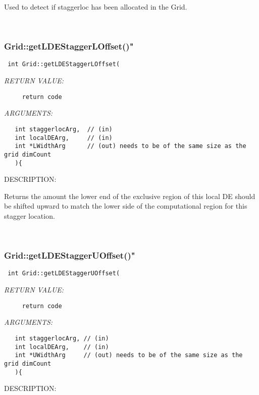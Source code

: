     Used to detect if staggerloc has been allocated in the Grid.
  
   
 
\mbox{}\hrulefill\
 
\subsubsection [Grid::getLDEStaggerLOffset()"] {Grid::getLDEStaggerLOffset()"}


  
\begin{verbatim} int Grid::getLDEStaggerLOffset(\end{verbatim}{\em RETURN VALUE:}
\begin{verbatim}     return code\end{verbatim}{\em ARGUMENTS:}
\begin{verbatim}   int staggerlocArg,  // (in)
   int localDEArg,     // (in)
   int *LWidthArg      // (out) needs to be of the same size as the grid dimCount
   ){\end{verbatim}
{\sf DESCRIPTION:\\ }


     Returns the amount the lower end of the exclusive region of
     this local DE should be shifted upward
     to match the lower side of the computational region for this stagger location.
   
 
\mbox{}\hrulefill\
 
\subsubsection [Grid::getLDEStaggerUOffset()"] {Grid::getLDEStaggerUOffset()"}


  
\begin{verbatim} int Grid::getLDEStaggerUOffset(\end{verbatim}{\em RETURN VALUE:}
\begin{verbatim}     return code\end{verbatim}{\em ARGUMENTS:}
\begin{verbatim}   int staggerlocArg, // (in)
   int localDEArg,    // (in)
   int *UWidthArg     // (out) needs to be of the same size as the grid dimCount
   ){\end{verbatim}
{\sf DESCRIPTION:\\ }


